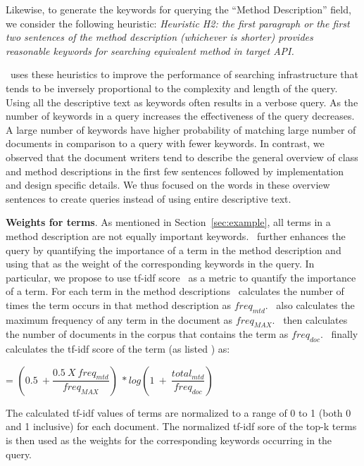 Likewise, to generate the keywords for querying the ``Method Description'' field, we consider the following heuristic: \textit{Heuristic H2: the first paragraph or the first two sentences of the method description (whichever is shorter) provides reasonable keywords for searching equivalent method in target API.}

\tool\ uses these heuristics to improve the performance of searching infrastructure
that tends to be inversely proportional to the complexity and length of the query.
Using all the descriptive text as keywords often results in a verbose query.
As the number of keywords in a query increases the effectiveness of the query decreases.
A large number of keywords have higher probability of matching large number of documents in comparison to a query with fewer keywords.
In contrast, we observed that the document writers tend to describe the general
overview of class and method descriptions in the first few sentences followed by implementation and design specific details.
We thus focused on the words in these overview sentences to create queries instead of using entire descriptive text.


\textbf{Weights for terms}. As mentioned in Section~\ref{sec:example},
all terms in a method description are not equally important keywords. 
\tool\ further enhances the query by quantifying the importance of a term in the method description and using that as the weight of the corresponding keywords in the query.
In particular, we propose to use tf-idf score~\cite{manning2008introduction} as a metric to quantify the importance of a term.
For each term in the method descriptions \tool\ calculates the number of times the term occurs in that method description as $freq_{mtd}$.
\tool\ also calculates the maximum frequency of any term in the document as $freq_{MAX}$.
\tool\ then calculates the number of documents in the corpus that contains the term as $freq_{doc}$.
\tool\ finally calculates the tf-idf score of the term (as listed \cite{manning2008introduction}) as:

\begin{center}
	 = $(0.5\ +\dfrac{0.5\ X\ freq_{mtd}}{freq_{MAX}})\ * log(1\ +\ \dfrac{total_{mtd}}{freq_{doc}})$
\end{center}

The calculated tf-idf values of terms are normalized to a range of 0 to 1 (both 0 and 1 inclusive) for each document.
The normalized tf-idf sore of the top-k terms is then used as the weights for the corresponding  keywords occurring in the query.

